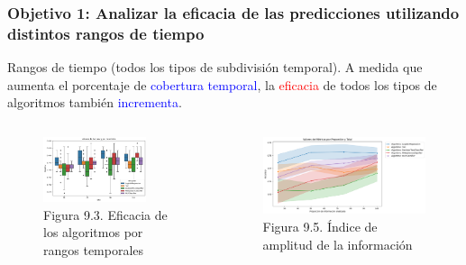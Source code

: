 \documentclass{beamer}
\begin{document}
\begin{frame}
	\frametitle{Objetivo 1: Analizar la eficacia de las predicciones utilizando distintos rangos de tiempo}
		\begin{block}{Rangos de tiempo (todos los tipos de subdivisión temporal).} 
	A medida que aumenta el porcentaje de \textcolor{blue}{cobertura temporal}, la \textcolor{red}{eficacia} de todos los tipos de algoritmos también \textcolor{blue}{incrementa}.

	\end{block}
	\begin{columns}[c]
		\begin{column}{.5\textwidth}
			\begin{figure}
				\centering
				\includegraphics[width=0.8\textwidth]{figs/cap7/figura_19}
				\caption{Figura 9.3. Eficacia de los algoritmos por rangos temporales}
			\end{figure}      
		\end{column}
		\begin{column}{.5\textwidth}
			\begin{figure}
				\centering
				\includegraphics[width=1\textwidth]{figs/cap7/figura_14}
				\caption{Figura 9.5. Índice de amplitud de la información}
			\end{figure}
		\end{column}
	\end{columns}

\end{frame}
\end{document}
